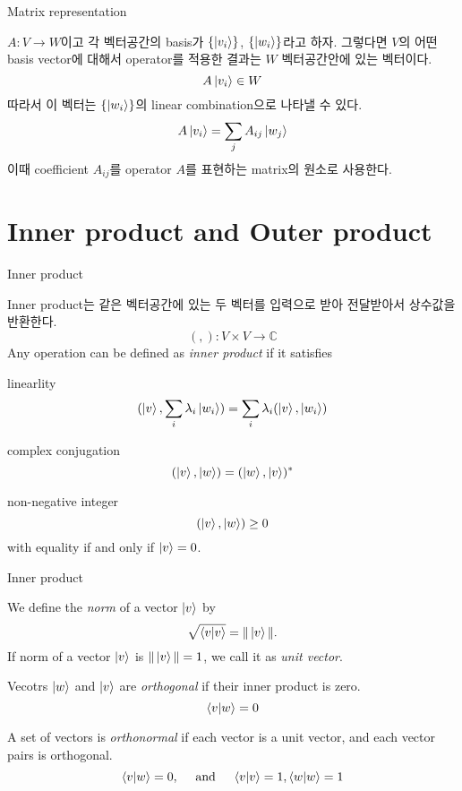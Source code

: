 \documentclass[9pt]{beamer}
\begin{document}
    
    \begin{frame}{Matrix representation}
        \begin{definition}
            $A:V \rightarrow W$이고 각 벡터공간의 basis가 $\{\ket{v_i}\}$, $\{\ket{w_i}\}$라고 하자. 
            그렇다면 $V$의 어떤 basis vector에 대해서 operator를 적용한 결과는 $W$ 벡터공간안에 있는 벡터이다. $$A\ket{v_i} \in W$$
            따라서 이 벡터는 $\{\ket{w_i}\}$의 linear combination으로 나타낼 수 있다. 
            $$A\ket{v_i} = \sum_{j}A_{ij} \ket{w_j}$$
            이때 coefficient $A_{ij}$를 operator $A$를 표현하는 matrix의 원소로 사용한다. 
        \end{definition}
    \end{frame}

    \section{Inner product and Outer product}
    \begin{frame}{Inner product}
        \begin{definition}
            Inner product는 같은 벡터공간에 있는 두 벡터를 입력으로 받아 전달받아서 상수값을 반환한다.
            $$(,) : V \times V \rightarrow \mathbb C$$
            Any operation can be defined as \textit{inner product} if it satisfies
            \itemize
                \item linearlity
                $$(\ket v, \sum_i \lambda_i \ket{w_i}) = \sum_i \lambda_i (\ket v, \ket{w_i})$$
                \item complex conjugation 
                $$(\ket v, \ket w) = (\ket w , \ket v)^*$$
                \item non-negative integer
                $$(\ket v, \ket w) \ge 0$$
                with equality if and only if $\ket v = 0$.
        \end{definition}
    \end{frame}

    \begin{frame}{Inner product}
        \begin{definition}[Norm]
            We define the \textit{norm} of a vector $\ket v$ by
            $$\sqrt{\braket{v|v}} = \|\ket v\|.$$
            If norm of a vector $\ket v$ is $\|\ket v\| = 1$, we call it as \textit{unit vector}.
        \end{definition}
        \begin{definition}[Orthogonality]
            Vecotrs $\ket w$ and $\ket v$ are \textit{orthogonal} if their inner product is zero.
            $${\braket{v|w}} = 0$$
        \end{definition}
        \begin{definition}[Orthonormal]
            A set of vectors is \textit {orthonormal} if each vector is a unit vector, and each vector pairs is orthogonal.
            $$\braket{v|w} = 0, \quad \text{ and } \quad  \braket{v|v} = 1, \braket{w|w} = 1$$
        \end{definition}
    \end{frame}
\end{document}
